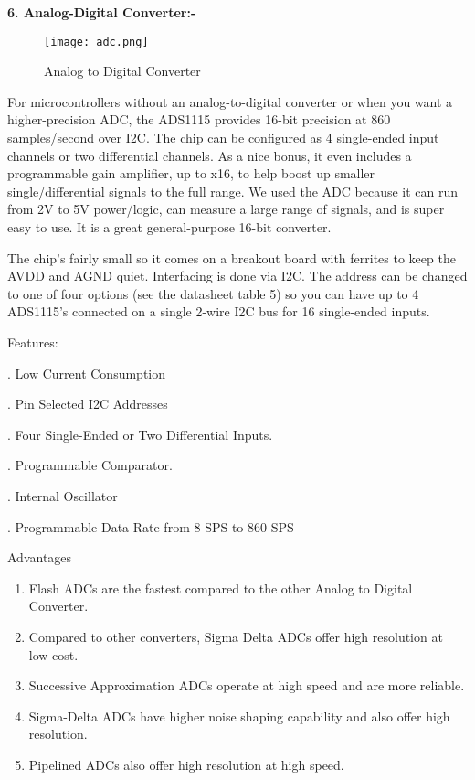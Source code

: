 \documentclass[12pt,a4paper]{report}
\begin{document}
\noindent 

\noindent 

\noindent \textbf{6. Analog-Digital Converter:-}
\begin{figure}[htp]
    \texttt{[image: adc.png]}
    \caption{Analog to Digital Converter }
\end{figure}


\noindent \textbf{}

\noindent For microcontrollers without an analog-to-digital converter or when you want a higher-precision ADC, the ADS1115 provides 16-bit precision at 860 samples/second over I2C. The chip can be configured as 4 single-ended input channels or two differential channels. As a nice bonus, it even includes a programmable gain amplifier, up to x16, to help boost up smaller single/differential signals to the full range. We used the ADC because it can run from 2V to 5V power/logic, can measure a large range of signals, and is super easy to use. It is a great general-purpose 16-bit converter.

\noindent The chip's fairly small so it comes on a breakout board with ferrites to keep the AVDD and AGND quiet. Interfacing is done via I2C. The address can be changed to one of four options (see the datasheet table 5) so you can have up to 4 ADS1115's connected on a single 2-wire I2C bus for 16 single-ended inputs.

\noindent Features:

. Low Current Consumption

. Pin Selected I2C Addresses

. Four Single-Ended or Two Differential Inputs.

. Programmable Comparator.

. Internal Oscillator

. Programmable Data Rate from 8 SPS to 860 SPS

\noindent Advantages 

\begin{enumerate}
\item  Flash ADCs are the fastest compared to the other Analog to Digital Converter.

\item  Compared to other converters, Sigma Delta ADCs offer high resolution at low-cost.

\item  Successive Approximation ADCs operate at high speed and are more reliable.

\item  Sigma-Delta ADCs have higher noise shaping capability and also offer high resolution.

\item  Pipelined ADCs also offer high resolution at high speed.
\end{enumerate}
\end{document}
